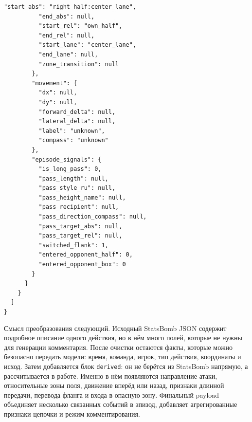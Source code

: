 \begin{lstlisting}[caption={Фрагмент реального payload эпизода для LLM},label={lst:llm-payload-example}]
          "start_abs": "right_half:center_lane",
          "end_abs": null,
          "start_rel": "own_half",
          "end_rel": null,
          "start_lane": "center_lane",
          "end_lane": null,
          "zone_transition": null
        },
        "movement": {
          "dx": null,
          "dy": null,
          "forward_delta": null,
          "lateral_delta": null,
          "label": "unknown",
          "compass": "unknown"
        },
        "episode_signals": {
          "is_long_pass": 0,
          "pass_length": null,
          "pass_style_ru": null,
          "pass_height_name": null,
          "pass_recipient": null,
          "pass_direction_compass": null,
          "pass_target_abs": null,
          "pass_target_rel": null,
          "switched_flank": 1,
          "entered_opponent_half": 0,
          "entered_opponent_box": 0
        }
      }
    }
  ]
}
\end{lstlisting}

Смысл преобразования следующий. Исходный StatsBomb JSON содержит подробное описание одного действия, но в нём много полей, которые не нужны для генерации комментария. После очистки остаются факты, которые можно безопасно передать модели: время, команда, игрок, тип действия, координаты и исход. Затем добавляется блок \texttt{derived}: он не берётся из StatsBomb напрямую, а рассчитывается в работе. Именно в нём появляются направление атаки, относительные зоны поля, движение вперёд или назад, признаки длинной передачи, перевода фланга и входа в опасную зону. Финальный payload объединяет несколько связанных событий в эпизод, добавляет агрегированные признаки цепочки и режим комментирования.
